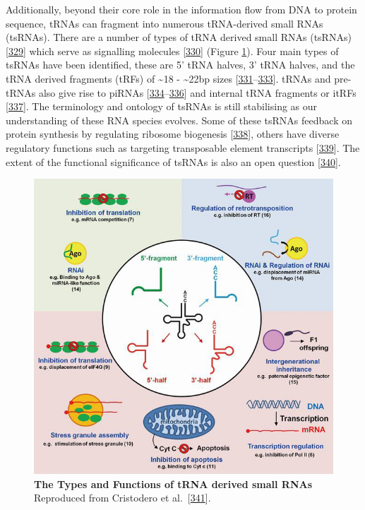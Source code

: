 \documentclass[
]{book}
\begin{document}
Additionally, beyond their core role in the information flow from DNA to protein sequence, tRNAs can fragment into numerous tRNA-derived small RNAs (tsRNAs).
There are a number of types of tRNA derived small RNAs (tsRNAs) {[}\protect\hyperlink{ref-Pliatsika2018}{329}{]} which serve as signalling molecules {[}\protect\hyperlink{ref-Lee2009}{330}{]} (Figure \ref{fig:tRNAderivedSmallRNARoles}).
Four main types of tsRNAs have been identified, these are 5' tRNA halves, 3' tRNA halves, and the tRNA derived fragments (tRFs) of \textasciitilde18 - \textasciitilde22bp sizes {[}\protect\hyperlink{ref-Torres2019}{331}--\protect\hyperlink{ref-Xu2017a}{333}{]}.
tRNAs and pre-tRNAs also give rise to piRNAs {[}\protect\hyperlink{ref-Keam2014}{334}--\protect\hyperlink{ref-Tosar2018}{336}{]} and internal tRNA fragments or itRFs {[}\protect\hyperlink{ref-Loher2017}{337}{]}.
The terminology and ontology of tsRNAs is still stabilising as our understanding of these RNA species evolves.
Some of these tsRNAs feedback on protein synthesis by regulating ribosome biogenesis {[}\protect\hyperlink{ref-Kim2017}{338}{]}, others have diverse regulatory functions such as targeting transposable element transcripts {[}\protect\hyperlink{ref-Martinez2017}{339}{]}.
The extent of the functional significance of tsRNAs is also an open question {[}\protect\hyperlink{ref-Schimmel2017}{340}{]}.

\begin{figure}

{\centering \includegraphics[width=1\linewidth]{./figs/tRNAderivedSmallRNARoles} 

}

\caption{\textbf{The Types and Functions of tRNA derived small RNAs} Reproduced from Cristodero et al.~{[}\protect\hyperlink{ref-Cristodero2017}{341}{]}.}\label{fig:tRNAderivedSmallRNARoles}
\end{figure}
\end{document}
